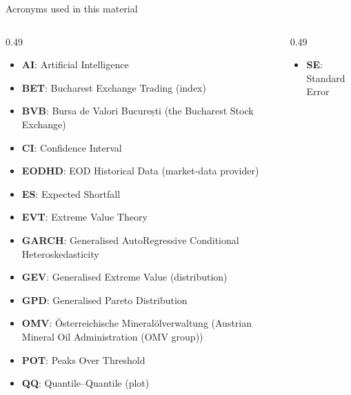 {
\begin{frame}[noframenumbering]
    \titlepage
\end{frame}
}
\begin{frame}{Acronyms used in this material}
\begin{columns}[T]
\begin{column}{0.49\textwidth}
\begin{itemize}\setlength{\itemsep}{0pt}
    \item \textbf{AI}: Artificial Intelligence
    \item \textbf{BET}: Bucharest Exchange Trading (index)
    \item \textbf{BVB}: Bursa de Valori București (the Bucharest Stock Exchange)
    \item \textbf{CI}: Confidence Interval
    \item \textbf{EODHD}: EOD Historical Data (market-data provider)
    \item \textbf{ES}: Expected Shortfall
    \item \textbf{EVT}: Extreme Value Theory
    \item \textbf{GARCH}: Generalised AutoRegressive Conditional Heteroskedasticity
    \item \textbf{GEV}: Generalised Extreme Value (distribution)
    \item \textbf{GPD}: Generalised Pareto Distribution
    \item \textbf{OMV}: Österreichische Mineralölverwaltung (Austrian Mineral Oil Administration (OMV group))
    \item \textbf{POT}: Peaks Over Threshold
    \item \textbf{QQ}: Quantile–Quantile (plot)
\end{itemize}
\end{column}
\begin{column}{0.49\textwidth}
\begin{itemize}\setlength{\itemsep}{0pt}
    \item \textbf{SE}: Standard Error
\end{itemize}
\end{column}
\end{columns}
\end{frame}

